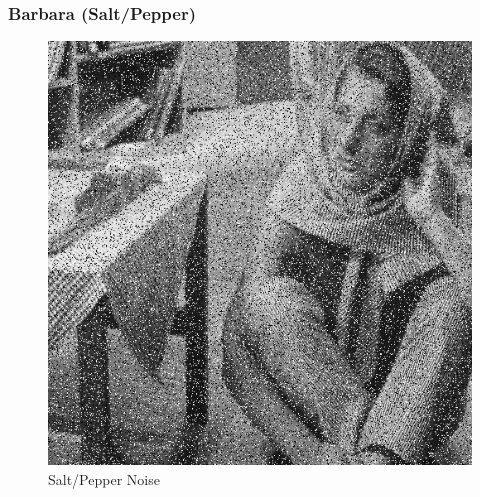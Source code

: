 \documentclass{article}
\begin{document}
    \subsubsection*{Barbara (Salt/Pepper)}
    
    \begin{figure}[!htb]
    \begin{center}
     \includegraphics[scale=.3]{./basic_denoising/barbara/sp.png}
     \caption{Salt/Pepper Noise}
    \end{center}
    \end{figure}
    
\end{document}
